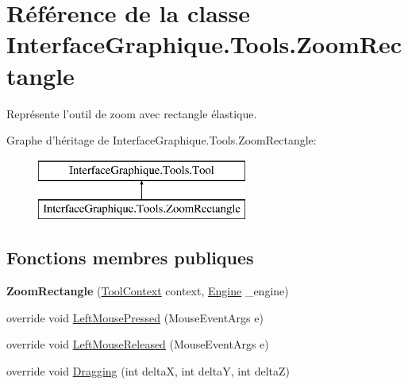 \hypertarget{class_interface_graphique_1_1_tools_1_1_zoom_rectangle}{\section{Référence de la classe Interface\-Graphique.\-Tools.\-Zoom\-Rectangle}
\label{class_interface_graphique_1_1_tools_1_1_zoom_rectangle}
}


Représente l'outil de zoom avec rectangle élastique.  


Graphe d'héritage de Interface\-Graphique.\-Tools.\-Zoom\-Rectangle\-:\begin{figure}[H]
\begin{center}
\leavevmode
\includegraphics[height=2.000000cm]{class_interface_graphique_1_1_tools_1_1_zoom_rectangle}
\end{center}
\end{figure}
\subsection*{Fonctions membres publiques}
\begin{DoxyCompactItemize}
\item 
\hypertarget{class_interface_graphique_1_1_tools_1_1_zoom_rectangle_a2c86e4c4dce5c68413615c93799b515f}{{\bfseries Zoom\-Rectangle} (\hyperlink{class_interface_graphique_1_1_tools_1_1_tool_context}{Tool\-Context} context, \hyperlink{class_interface_graphique_1_1_engine}{Engine} \-\_\-engine)}\label{class_interface_graphique_1_1_tools_1_1_zoom_rectangle_a2c86e4c4dce5c68413615c93799b515f}

\item 
override void \hyperlink{class_interface_graphique_1_1_tools_1_1_zoom_rectangle_aea89e1a6d0043a6256b58d14e68331c6}{Left\-Mouse\-Pressed} (Mouse\-Event\-Args e)
\item 
override void \hyperlink{class_interface_graphique_1_1_tools_1_1_zoom_rectangle_a1b7f36743fbfc90c84ee0f32f333ca63}{Left\-Mouse\-Released} (Mouse\-Event\-Args e)
\item 
override void \hyperlink{class_interface_graphique_1_1_tools_1_1_zoom_rectangle_a8af5ed7644c22e033f4ad438f3221854}{Dragging} (int delta\-X, int delta\-Y, int delta\-Z)
\end{DoxyCompactItemize}
